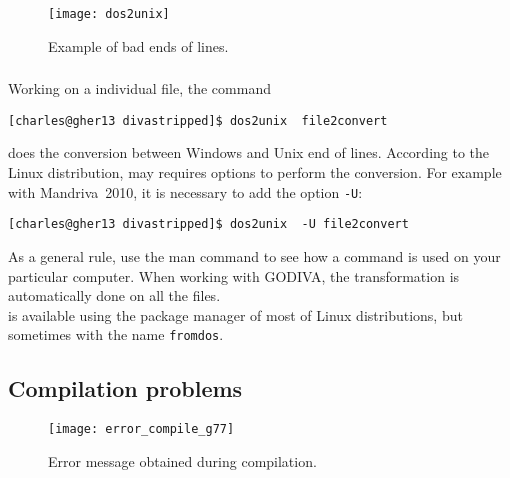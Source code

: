 \begin{figure}[htpb]
\centering
\texttt{[image: dos2unix]}
\caption{Example of bad ends of lines.\label{fig:error_dos2unix2}}
\end{figure}


\subsubsection{\answer}

Working on a individual file, the command\\

\begin{lstlisting}[style=Bash]
[charles@gher13 divastripped]$ dos2unix  file2convert
\end{lstlisting}
does the conversion between Windows and Unix end of lines. According to the Linux distribution,  may requires options to perform the conversion. For example with Mandriva~2010, it is necessary to add the option \texttt{-U}:

\begin{lstlisting}[style=Bash]
[charles@gher13 divastripped]$ dos2unix  -U file2convert
\end{lstlisting}
As a general rule, use the man command to see how a command is used on your particular computer. 
When working with GODIVA, the transformation is automatically done on all the files. \\
 is available using the package manager of most of Linux distributions, but sometimes with the name \texttt{fromdos}.


\subsection{Compilation problems\label{sec:error_compile}}

\begin{figure}[htpb]
\centering
\texttt{[image: error\_compile\_g77]}
\caption{Error message obtained during compilation. \label{fig:error_compile}}
\end{figure}

\subsection{\question}


